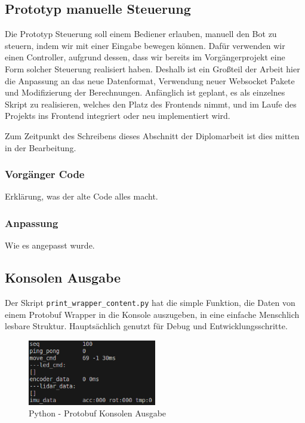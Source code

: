 \subsection{Prototyp manuelle Steuerung}
Die Prototyp Steuerung soll einem Bediener erlauben, manuell den Bot zu steuern,
indem wir mit einer Eingabe bewegen können. 
% 
Dafür verwenden wir einen Controller, 
aufgrund dessen, dass wir bereits im Vorgängerprojekt
eine Form solcher Steuerung realisiert haben. 
Deshalb ist ein Großteil der Arbeit hier die Anpassung an das neue Datenformat, 
Verwendung neuer Websocket Pakete und Modifizierung der Berechnungen.
% 
Anfänglich ist geplant, es als einzelnes Skript zu realisieren, 
welches den Platz des Frontends nimmt, 
und im Laufe des Projekts ins Frontend integriert oder neu implementiert wird.

Zum Zeitpunkt des Schreibens dieses Abschnitt der Diplomarbeit 
ist dies mitten in der Bearbeitung.
\subsubsection{Vorgänger Code}
Erklärung, was der alte Code alles macht.
\subsubsection{Anpassung}
Wie es angepasst wurde.

\subsection{Konsolen Ausgabe}
Der Skript \texttt{print\_wrapper\_content.py} hat die simple Funktion, 
die Daten von einem Protobuf Wrapper in die Konsole auszugeben, 
in eine einfache Menschlich lesbare Struktur. 
Hauptsächlich genutzt für Debug und Entwicklungsschritte.

\begin{figure}[H]
    \includegraphics[width=0.5\textwidth, center]{img/Backend/print_wrapper_all.png}
    \caption{Python - Protobuf Konsolen Ausgabe}
    \label{fig:py_konsole_o}
\end{figure}

